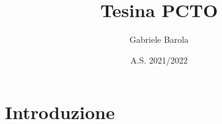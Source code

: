 \documentclass{article}
\title{Tesina PCTO}
\author{Gabriele Barola}
\date{A.S. 2021/2022}
\begin{document}
\maketitle
\section{Introduzione}
\end{document}
